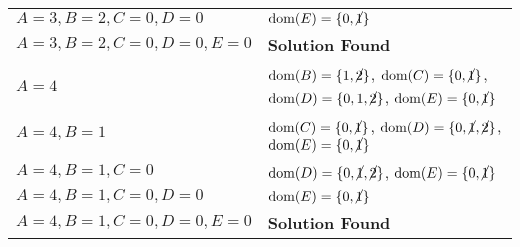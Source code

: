 \begin{example}
\begin{center}
\begin{tabular}{ll}
            $A=3,B=2,C=0,D=0$ & $\text{dom}(E) = \{0,\cancel{1}\}$ \\
            $A=3,B=2,C=0,D=0,E=0$ & \textbf{Solution Found} \\
            \midrule 
            $A=4$ & $\text{dom}(B) = \{1,\cancel{2}\}$, $\text{dom}(C) = \{0,\cancel{1}\}$, $\text{dom}(D) = \{0,1,\cancel{2}\}$, $\text{dom}(E) = \{0,\cancel{1}\}$ \\
            $A=4,B=1$ & $\text{dom}(C) = \{0,\cancel{1}\}$, $\text{dom}(D) = \{0,\cancel{1},\cancel{2}\}$, $\text{dom}(E) = \{0,\cancel{1}\}$ \\
            $A=4,B=1,C=0$ & $\text{dom}(D) = \{0,\cancel{1},\cancel{2}\}$, $\text{dom}(E) = \{0,\cancel{1}\}$ \\
            $A=4,B=1,C=0,D=0$ & $\text{dom}(E) = \{0,\cancel{1}\}$ \\
            $A=4,B=1,C=0,D=0,E=0$ & \textbf{Solution Found} \\
            \bottomrule
        \end{tabular}
    \end{center}
\end{example}
\newpage


